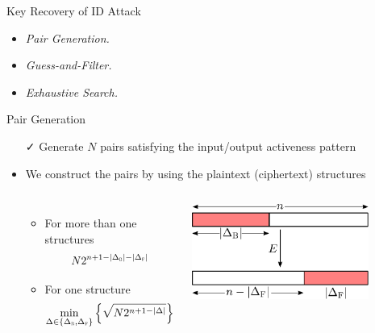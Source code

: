 \documentclass[table,aspectratio=169]{beamer}
\newcommand{\In}{_{\textsc{b}}} %
\newcommand{\Out}{_{\textsc{f}}} %
\begin{document}
\begin{frame}{Key Recovery of ID Attack}
  \begin{itemize}
  \item \textit{Pair Generation.} 
  \item \textit{Guess-and-Filter.} 
  \item \textit{Exhaustive Search.} 
\end{itemize}
\end{frame}

\begin{frame}{Pair Generation}
\begin{itemize}
\item[\faCheck] Generate $N$ pairs satisfying the input/output activeness pattern
\item We construct the pairs by using the plaintext (ciphertext) structures
\begin{columns}[onlytextwidth]
\begin{itemize}
  \item For more than one structures
  \[N 2^{n + 1 - |\Delta\In| - |\Delta\Out|}\]
  \item For one structure 
  \[\min_{\Delta \in \{\Delta\In, \Delta\Out\}} \left\{ \sqrt{N 2^{n + 1 - |\Delta|}} \right\}\]
\end{itemize}
\centering
\includegraphics[width=0.8\textwidth]{./figures/limited_birthday_problem.pdf}
\end{columns}
\end{itemize}
\end{frame}
\end{document}
